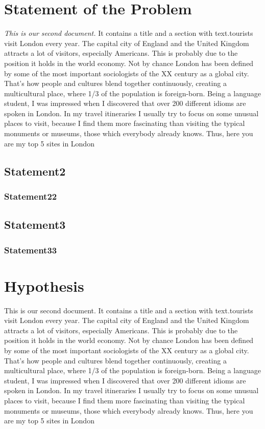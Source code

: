 \documentclass[a4paper,twoside]{report}
\begin{document}
\section{Statement of the Problem}
\textit{This is our second document.}\cite{RN853} It contains a title and a 
section with text.tourists visit London every year\cite{RN869}. The capital city of England and the United Kingdom attracts a lot of visitors, especially Americans. This is probably due to the position it holds in the world economy.
Not by chance London has been defined by some of the most important sociologists of the XX century as a global city. That’s how people and cultures blend together continuously, creating a multicultural place, where 1/3 of the population is foreign-born. Being a language student, I was impressed when I discovered that over 200 different idioms are spoken in London.
In my travel itineraries I usually try to focus on some unusual places to visit, because I find them more fascinating than visiting the typical monuments or museums, those which everybody already knows. Thus, here you are my top 5 sites in London
\subsection{Statement2}
\zhlipsum[2-8]
\subsubsection{Statement22}
\zhlipsum[2-8]
\subsection{Statement3}
\zhlipsum[2-8]
\subsubsection{Statement33}
\zhlipsum[2-8]

\newpage
\section{Hypothesis}
This is our second document. It contains a title and a 
section with text.tourists visit London every year. The capital city of England and the United Kingdom attracts a lot of visitors, especially Americans. This is probably due to the position it holds in the world economy.
Not by chance London has been defined by some of the most important sociologists of the XX century as a global city. That’s how people and cultures blend together continuously, creating a multicultural place, where 1/3 of the population is foreign-born. Being a language student, I was impressed when I discovered that over 200 different idioms are spoken in London.
In my travel itineraries I usually try to focus on some unusual places to visit, because I find them more fascinating than visiting the typical monuments or museums, those which everybody already knows. Thus, here you are my top 5 sites in London
\end{document}
